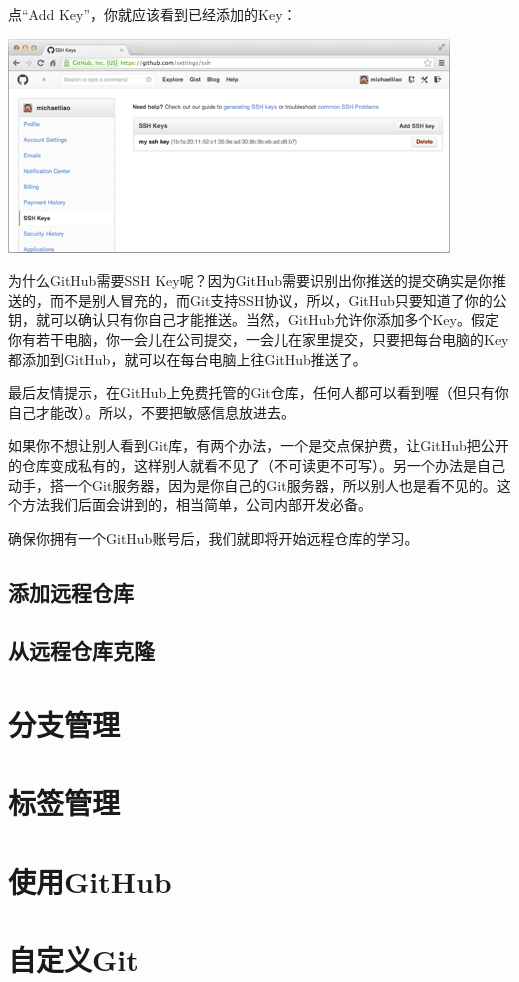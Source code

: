 \documentclass[•]{article}
\begin{document}
\begin{CJK}{UTF8}{gbsn}
点“Add Key”，你就应该看到已经添加的Key：

\begin{center}
\includegraphics[scale=0.6]{add_key.png}
\end{center}

\qquad 为什么GitHub需要SSH Key呢？因为GitHub需要识别出你推送的提交确实是你推送的，而不是别人冒充的，而Git支持SSH协议，所以，GitHub只要知道了你的公钥，就可以确认只有你自己才能推送。当然，GitHub允许你添加多个Key。假定你有若干电脑，你一会儿在公司提交，一会儿在家里提交，只要把每台电脑的Key都添加到GitHub，就可以在每台电脑上往GitHub推送了。

\qquad 最后友情提示，在GitHub上免费托管的Git仓库，任何人都可以看到喔（但只有你自己才能改）。所以，不要把敏感信息放进去。

\qquad 如果你不想让别人看到Git库，有两个办法，一个是交点保护费，让GitHub把公开的仓库变成私有的，这样别人就看不见了（不可读更不可写）。另一个办法是自己动手，搭一个Git服务器，因为是你自己的Git服务器，所以别人也是看不见的。这个方法我们后面会讲到的，相当简单，公司内部开发必备。

确保你拥有一个GitHub账号后，我们就即将开始远程仓库的学习。

\subsection{添加远程仓库}
\subsection{从远程仓库克隆}
\section{分支管理}
\section{标签管理}
\section{使用GitHub}
\section{自定义Git}
\end{CJK}
\end{document}
